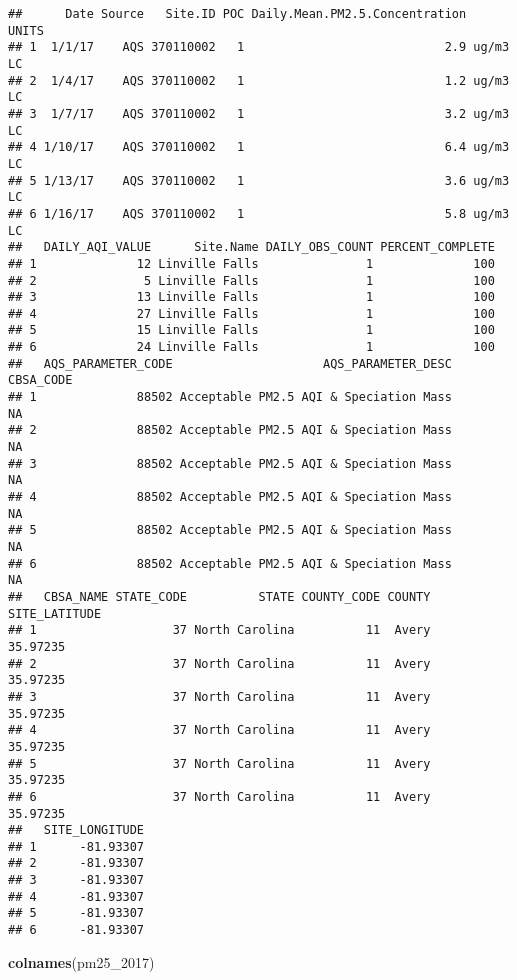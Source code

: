 \documentclass[]{article}
\newenvironment{Shaded}{\begin{snugshade}}{\end{snugshade}}
\newcommand{\KeywordTok}[1]{\textcolor[rgb]{0.13,0.29,0.53}{\textbf{#1}}}
\newcommand{\DecValTok}[1]{\textcolor[rgb]{0.00,0.00,0.81}{#1}}
\newcommand{\NormalTok}[1]{#1}
\begin{document}
\begin{verbatim}
##      Date Source   Site.ID POC Daily.Mean.PM2.5.Concentration    UNITS
## 1  1/1/17    AQS 370110002   1                            2.9 ug/m3 LC
## 2  1/4/17    AQS 370110002   1                            1.2 ug/m3 LC
## 3  1/7/17    AQS 370110002   1                            3.2 ug/m3 LC
## 4 1/10/17    AQS 370110002   1                            6.4 ug/m3 LC
## 5 1/13/17    AQS 370110002   1                            3.6 ug/m3 LC
## 6 1/16/17    AQS 370110002   1                            5.8 ug/m3 LC
##   DAILY_AQI_VALUE      Site.Name DAILY_OBS_COUNT PERCENT_COMPLETE
## 1              12 Linville Falls               1              100
## 2               5 Linville Falls               1              100
## 3              13 Linville Falls               1              100
## 4              27 Linville Falls               1              100
## 5              15 Linville Falls               1              100
## 6              24 Linville Falls               1              100
##   AQS_PARAMETER_CODE                     AQS_PARAMETER_DESC CBSA_CODE
## 1              88502 Acceptable PM2.5 AQI & Speciation Mass        NA
## 2              88502 Acceptable PM2.5 AQI & Speciation Mass        NA
## 3              88502 Acceptable PM2.5 AQI & Speciation Mass        NA
## 4              88502 Acceptable PM2.5 AQI & Speciation Mass        NA
## 5              88502 Acceptable PM2.5 AQI & Speciation Mass        NA
## 6              88502 Acceptable PM2.5 AQI & Speciation Mass        NA
##   CBSA_NAME STATE_CODE          STATE COUNTY_CODE COUNTY SITE_LATITUDE
## 1                   37 North Carolina          11  Avery      35.97235
## 2                   37 North Carolina          11  Avery      35.97235
## 3                   37 North Carolina          11  Avery      35.97235
## 4                   37 North Carolina          11  Avery      35.97235
## 5                   37 North Carolina          11  Avery      35.97235
## 6                   37 North Carolina          11  Avery      35.97235
##   SITE_LONGITUDE
## 1      -81.93307
## 2      -81.93307
## 3      -81.93307
## 4      -81.93307
## 5      -81.93307
## 6      -81.93307
\end{verbatim}

\begin{Shaded}
\begin{Highlighting}[]
\KeywordTok{colnames}\NormalTok{(pm25_}\DecValTok{2017}\NormalTok{)}
\end{Highlighting}
\end{Shaded}
\end{document}
